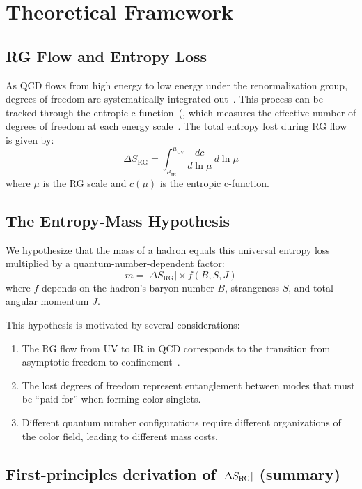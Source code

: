 \documentclass[12pt,a4paper]{article}
\begin{document}
\section{Theoretical Framework}

\subsection{RG Flow and Entropy Loss}

As QCD flows from high energy to low energy under the renormalization group, degrees of freedom are systematically integrated out~\cite{Polchinski1984,Wilson1974}. This process can be tracked through the entropic c-function\ (\cite{CHM,KS}, which measures the effective number of degrees of freedom at each energy scale~\cite{Braun2007}. The total entropy lost during RG flow is given by:
\begin{equation}
\Delta S_{\text{RG}} = \int_{\mu_{\text{IR}}}^{\mu_{\text{UV}}} \frac{dc}{d\ln\mu} \, d\ln\mu
\end{equation}
where $\mu$ is the RG scale and $c(\mu)$ is the entropic c-function.

\subsection{The Entropy-Mass Hypothesis}

We hypothesize that the mass of a hadron equals this universal entropy loss multiplied by a quantum-number-dependent factor:
\begin{equation}
m = |\Delta S_{\text{RG}}| \times f(B, S, J)
\end{equation}
where $f$ depends on the hadron's baryon number $B$, strangeness $S$, and total angular momentum $J$.

This hypothesis is motivated by several considerations:
\begin{enumerate}
\item The RG flow from UV to IR in QCD corresponds to the transition from asymptotic freedom to confinement~\cite{Gross1973}.
\item The lost degrees of freedom represent entanglement between modes that must be ``paid for'' when forming color singlets.
\item Different quantum number configurations require different organizations of the color field, leading to different mass costs.
\end{enumerate}

\subsection{First-principles derivation of $|\Delta S_{\rm RG}|$ (summary)}
\label{subsec:derivation-summary}
\end{document}
